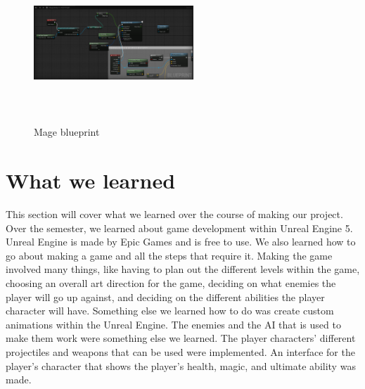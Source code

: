 \documentclass{sigchi}
\begin{document}
 
\begin{figure}


\includegraphics[width=6cm, height=6cm]{Figure/MageAbility.png}
\caption{Mage blueprint}
\end{figure}

\section{What we learned}
This section will cover what we learned over the course of making our project. Over the semester, we learned about game development within Unreal Engine 5. Unreal Engine is made by Epic Games and is free to use. We also learned how to go about making a game and all the steps that require it. Making the game involved many things, like having to plan out the different levels within the game, choosing an overall art direction for the game, deciding on what enemies the player will go up against, and deciding on the different abilities the player character will have. Something else we learned how to do was create custom animations within the Unreal Engine. The enemies and the AI that is used to make them work were something else we learned. The player characters' different projectiles and weapons that can be used were implemented. An interface for the player's character that shows the player's health, magic, and ultimate ability was made.
\end{document}

